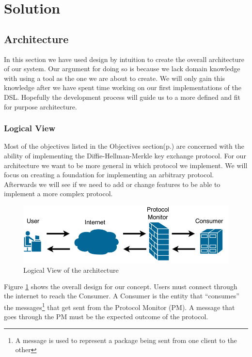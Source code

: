 \section{Solution}
\subsection{Architecture}
In this section we have used design by intuition to create the overall architecture of our system. Our argument for doing so is because we lack domain knowledge with using a tool as the one we are about to create. We will only gain this knowledge after we have spent time working on our first implementations of the DSL. Hopefully the development process will guide us to a more defined and fit for purpose architecture.

\subsubsection{Logical View}
Most of the objectives listed in the Objectives section(p.\pageref{sec:objectives}) are concerned with the ability of implementing the Diffie-Hellman-Merkle key exchange protocol. For our architecture we want to be more general in which protocol we implement. We will focus on creating a foundation for implementing an arbitrary protocol. Afterwards we will see if we need to add or change features to be able to implement a more complex protocol.

\begin{figure}[h]
	\centering
	\includegraphics[scale=0.45]{images/architecture/ArchitectureFigure1.png} 
	\caption{Logical View of the architecture}
	\label{fig:ArchitectureFigure1}
\end{figure}
Figure \ref{fig:ArchitectureFigure1} shows the overall design for our concept. Users must connect through the internet to reach the Consumer. A Consumer is the entity that ``consumes'' the messages\footnote{A message is used to represent a package being sent from one client to the other} that get sent from the Protocol Monitor (PM). A message that goes through the PM must be the expected outcome of the protocol.

